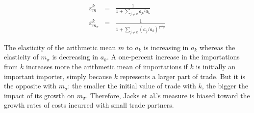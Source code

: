 \documentclass{article}
\begin{document}
\begin{eqnarray*}
\varepsilon_m^k&=& \frac{1}{1+\sum\limits_{j \neq k} a_j/a_k}\\
\varepsilon_{m_{\sigma}}^k&=&\frac{1}{1+\sum\limits_{j\neq k} (a_j/a_k)^{\frac{1}{1-\sigma}}}
\end{eqnarray*}

The elasticity of the arithmetic mean $m$ to $a_k$ is
increasing in $a_k$ whereas the elasticity of $m_{\sigma}$ is
decreasing in $a_k$. A one-percent increase in the importations
from $k$ increases more the arithmetic mean of importations if
$k$ is initially an important importer, simply because $k$
represents a larger part of trade. But it is the opposite with
$m_{\sigma}$: the smaller the initial value of trade with $k$,
the bigger the impact of its growth on $m_{\sigma}$. Therefore,
Jacks et al.'s measure is biased toward the growth rates of
costs incurred with small trade partners.



\end{document}
